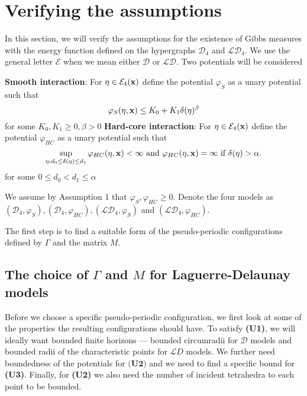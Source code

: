 \section{Verifying the assumptions}\label{sec:verifyassumptions}
In this section, we will verify the assumptions for the existence of Gibbs measures with the energy function defined on the hypergraphs $\mathcal D_4$ and $\mathcal {LD}_4$. We use the general letter $\mathcal E$ when we mean either $\mathcal D$ or $\mathcal {LD}$. Two potentials will be considered

\noindent \textbf{Smooth interaction}:  For $\eta\in\mathcal E_4({\mathbf{x}})$ define the potential $\varphi_S$ as a unary potential such that
$$\varphi_S(\eta,{\mathbf{x}}) \leq K_0 + K_1 \delta(\eta)^{\beta}$$
for some $K_0,K_1 \geq 0, \beta >0$\newline
\textbf{Hard-core interaction}: For $\eta\in\mathcal E_4({\mathbf{x}})$ define the potential $\varphi_{HC}$ as a unary potential such that
$$\sup_{\eta: d_0 \leq \delta(\eta) \leq d_1} \varphi_{HC}(\eta,{\mathbf{x}})  < \infty \text{ and } \varphi_{HC}(\eta,{\mathbf{x}})=\infty \text{ if } \delta(\eta)>\alpha.$$ 
for some $0\leq d_0 < d_1 \leq \alpha$ 

\noindent We assume by Assumption 1 that $\varphi_S,\varphi_{HC}\geq 0$. Denote the four models as $(\mathcal D_4,\varphi_{S}),(\mathcal D_4,\varphi_{HC}),(\mathcal {LD}_4,\varphi_{S})$ and $(\mathcal {LD}_4, \varphi_{HC})$. \newline

The first step is to find a suitable form of the pseudo-periodic configurations defined by $\Gamma$ and the matrix $M$. 

\subsection{The choice of $\Gamma$ and $M$ for Laguerre-Delaunay models}\label{sec:MGamma}
Before we choose a specific pseudo-periodic configuration, we first look at some of the properties the resulting configurations should have. To satisfy \textbf{(U1)}, we will ideally want bounded finite horizons --- bounded circumradii for $\mathcal D$ models and bounded radii of the characteristic points for $\mathcal LD$ models. We further need boundedness of the potentials for $\textbf{(U2)}$ and we need to find a specific bound for \textbf{(U3)}. Finally, for \textbf{(U2)} we also need the number of incident tetrahedra to each point to be bounded.

